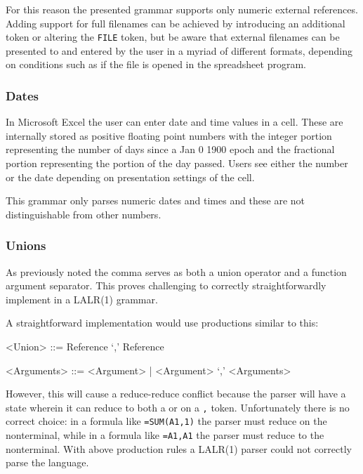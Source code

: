 \documentclass[conference]{IEEEtran}
\begin{document}
For this reason the presented grammar supports only numeric external references.
Adding support for full filenames can be achieved by introducing an additional token or altering the \texttt{FILE} token, but be aware that external filenames can be presented to and entered by the user in a myriad of different formats, depending on conditions such as if the file is opened in the spreadsheet program.

\subsubsection{\textbf{Dates}}

In Microsoft Excel the user can enter date and time values in a cell.
These are internally stored as positive floating point numbers with the integer portion representing the number of days since a Jan 0 1900 epoch and the fractional portion representing the portion of the day passed.
Users see either the number or the date depending on presentation settings of the cell.

This grammar only parses numeric dates and times and these are not distinguishable from other numbers.

\subsubsection{\textbf{Unions}}
\label{subsec:desing:unions}

As previously noted the comma serves as both a union operator and a function argument separator.
This proves challenging to correctly straightforwardly implement in a LALR(1) grammar.

A straightforward implementation would use productions similar to this:

\begin{grammar}
<Union> ::= Reference `,' Reference

<Arguments> ::= <Argument> | <Argument> `,' <Arguments>
\end{grammar}

However, this will cause a reduce-reduce conflict because the parser will have a state wherein it can reduce to both a  or  on a \texttt{,} token.
Unfortunately there is no correct choice: in a formula like \texttt{=SUM(A1,1)} the parser must reduce on the  nonterminal, while in a formula like \texttt{=A1,A1} the parser must reduce to the  nonterminal.
With above production rules a LALR(1) parser could not correctly parse the language.
\end{document}
